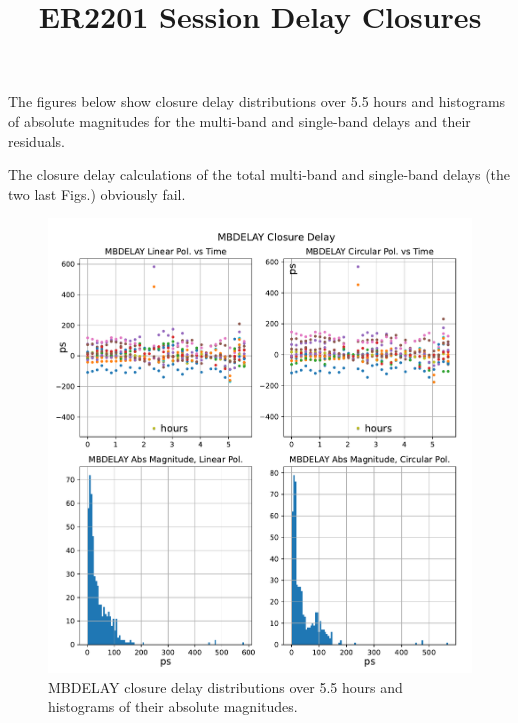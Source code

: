 \documentclass[letterpaper,twoside,12pt]{article}
\title{ER2201 Session Delay Closures}
\begin{document}
\maketitle

The figures below show closure delay distributions over 5.5 hours and histograms of absolute magnitudes for the multi-band and single-band delays and their residuals.

The closure delay calculations of the total multi-band and single-band delays (the two last Figs.) obviously fail.

\begin{figure}[h!]
  \centering
  \includegraphics[width=35pc]{MBDELAY_Closure_Delay.pdf}
  \caption{\small MBDELAY closure delay distributions over 5.5 hours and histograms of their absolute magnitudes.}
  \label{mbd}
\end{figure}
\end{document}
